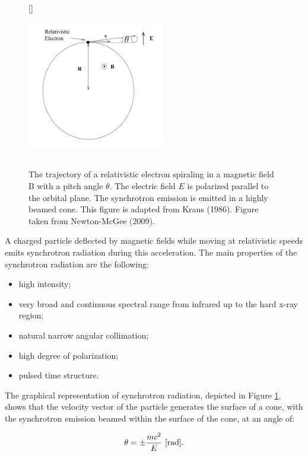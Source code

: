 \documentclass[a4paper,10pt]{article}
\begin{document}
\begin{figure}[h]
    [\FBwidth]
    {\caption{\footnotesize{\\The trajectory of a relativistic electron spiraling in a magnetic field B with a pitch angle $\theta$. The electric field $E$ is polarized parallel to the orbital plane. The synchrotron emission is emitted in a highly beamed cone. This figure is adapted from Kraus (1986). Figure taken from Newton-McGee (2009).}}
    \label{fig:synchrotrondiagram}}
    {\includegraphics[width=6cm]{figures/SynchrotronDiagram.png}}
\end{figure}

{\noindent}A charged particle deflected by magnetic fields while moving at relativistic speeds emits synchrotron radiation during this acceleration. The main properties of the synchrotron radiation are the following:

\begin{itemize}
    \item high intensity;
    \item very broad and continuous spectral range from infrared up to the hard x-ray region;
    \item natural narrow angular collimation;
    \item high degree of polarization;
    \item pulsed time structure.
\end{itemize}

The graphical representation of synchrotron radiation, depicted in Figure \ref{fig:synchrotrondiagram}, shows that the velocity vector of the particle generates the surface of a cone, with the synchrotron emission beamed within the surface of the cone, at an angle of:

\begin{align*}
    \theta = \pm \frac{mc^2}{E} ~ [{\rm rad}].
\end{align*}
\end{document}
